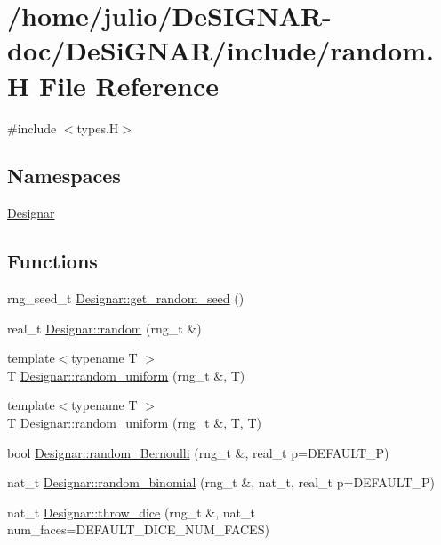 \hypertarget{random_8_h}{}\section{/home/julio/\+De\+S\+I\+G\+N\+A\+R-\/doc/\+De\+Si\+G\+N\+A\+R/include/random.H File Reference}
\label{random_8_h}
{\ttfamily \#include $<$types.\+H$>$}\newline
\subsection*{Namespaces}
\begin{DoxyCompactItemize}
\item 
 \hyperlink{namespace_designar}{Designar}
\end{DoxyCompactItemize}
\subsection*{Functions}
\begin{DoxyCompactItemize}
\item 
rng\+\_\+seed\+\_\+t \hyperlink{namespace_designar_a39f540907bf568cf8e9983cffbc5246c}{Designar\+::get\+\_\+random\+\_\+seed} ()
\item 
real\+\_\+t \hyperlink{namespace_designar_ae380ee144e16364a26bec38110ac58cc}{Designar\+::random} (rng\+\_\+t \&)
\item 
{\footnotesize template$<$typename T $>$ }\\T \hyperlink{namespace_designar_a1ac1e0ffd178b0439770840ea75144e0}{Designar\+::random\+\_\+uniform} (rng\+\_\+t \&, T)
\item 
{\footnotesize template$<$typename T $>$ }\\T \hyperlink{namespace_designar_a7b0ea319994973073cc92067730c1c1c}{Designar\+::random\+\_\+uniform} (rng\+\_\+t \&, T, T)
\item 
bool \hyperlink{namespace_designar_adf6febbe5fa0abe44ea554203b767685}{Designar\+::random\+\_\+\+Bernoulli} (rng\+\_\+t \&, real\+\_\+t p=D\+E\+F\+A\+U\+L\+T\+\_\+P)
\item 
nat\+\_\+t \hyperlink{namespace_designar_a4f786bd2e0e15f81f468cf60b3a1d9fb}{Designar\+::random\+\_\+binomial} (rng\+\_\+t \&, nat\+\_\+t, real\+\_\+t p=D\+E\+F\+A\+U\+L\+T\+\_\+P)
\item 
nat\+\_\+t \hyperlink{namespace_designar_a29b53c8e7dfb33209e0a79ad167b6803}{Designar\+::throw\+\_\+dice} (rng\+\_\+t \&, nat\+\_\+t num\+\_\+faces=D\+E\+F\+A\+U\+L\+T\+\_\+\+D\+I\+C\+E\+\_\+\+N\+U\+M\+\_\+\+F\+A\+C\+ES)
\end{DoxyCompactItemize}
